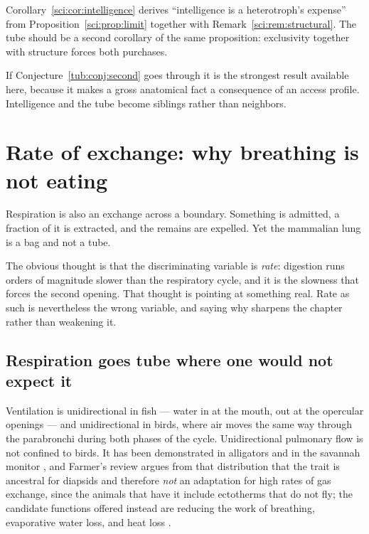 \begin{conjecture}
\label{tub:conj:second}
Corollary~\ref{sci:cor:intelligence} derives ``intelligence is a heterotroph's
expense'' from Proposition~\ref{sci:prop:limit} together with
Remark~\ref{sci:rem:structural}. The tube should be a second corollary of the
same proposition: exclusivity together with structure forces both purchases.
\end{conjecture}

If Conjecture~\ref{tub:conj:second} goes through it is the strongest result
available here, because it makes a gross anatomical fact a consequence of an
access profile. Intelligence and the tube become siblings rather than neighbors.

\section{Rate of exchange: why breathing is not eating}
\label{tub:sec:rate}

Respiration is also an exchange across a boundary. Something is admitted, a
fraction of it is extracted, and the remains are expelled. Yet the mammalian
lung is a bag and not a tube.

The obvious thought is that the discriminating variable is \emph{rate}:
digestion runs orders of magnitude slower than the respiratory cycle, and it is
the slowness that forces the second opening. That thought is pointing at
something real. Rate as such is nevertheless the wrong variable, and saying why
sharpens the chapter rather than weakening it.

\subsection{Respiration goes tube where one would not expect it}

Ventilation is unidirectional in fish --- water in at the mouth, out at the
opercular openings --- and unidirectional in birds, where air moves the same way
through the parabronchi during both phases of the cycle. Unidirectional
pulmonary flow is not confined to birds. It has been demonstrated in alligators
\cite{farmersanders2010} and in the savannah monitor \cite{schachner2014}, and
Farmer's review argues from that distribution that the trait is ancestral for
diapsids and therefore \emph{not} an adaptation for high rates of gas exchange,
since the animals that have it include ectotherms that do not fly; the candidate
functions offered instead are reducing the work of breathing, evaporative water
loss, and heat loss \cite{farmer2015}.

